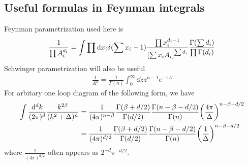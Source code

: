 \documentclass{article}
\newcommand{\vbk}{\vb{k}}
\renewcommand{\a}{\alpha}
\renewcommand{\b}{\beta}
\begin{document}
\clearpage

\begin{appendices}
	\section{Useful formulas in Feynman integrals}
	Feynman parametrization used here is
	\begin{align}
		\frac{1}{\prod A_i^{d_i}}=\int\prod \dd x_i \delta(\sum x_i-1)\frac{\prod x_i^{d_i-1}}{\bqty{\sum x_iA_i}^{\sum d_i}}\frac{\Gamma(\sum d_i)}{\prod\Gamma(d_i)}
		\label{FEYNMANPARA}
	\end{align}
	Schwinger parametrization will also be useful
	\begin{align}
		\frac{1}{A^n}=\frac{1}{\Gamma{(n)}}\int_0^\infty\dd z z^{n-1}e^{-zA}
	\end{align}
	For arbitary one loop diagram of the following form, we have
	\begin{subequations} \label{1loopgamma}
		\begin{align}
			\int\frac{\dd^dk}{(2\pi)^d}\frac{k^{2\b}}{(k^2+\Delta)^n}
			  & =\frac{1}{(4\pi)^{n-\b}}\frac{\Gamma(\b+d/2)}{\Gamma(d/2)}\frac{\Gamma(n-\b-d/2)}{\Gamma(n)}\pqty{\frac{4\pi}{\Delta}}^{n-\b-d/2} \\
			  & =\frac{1}{(4\pi)^{d/2}}\frac{\Gamma(\b+d/2)}{\Gamma(d/2)}\frac{\Gamma(n-\b-d/2)}{\Gamma(n)}\pqty{\frac{1}{\Delta}}^{n-\b-d/2}
		\end{align}
	\end{subequations}
	where $\frac{1}{(4\pi)^{d/2}}$ often appears as $2^{-d}\pi^{-d/2}$.

\end{appendices}
\end{document}
